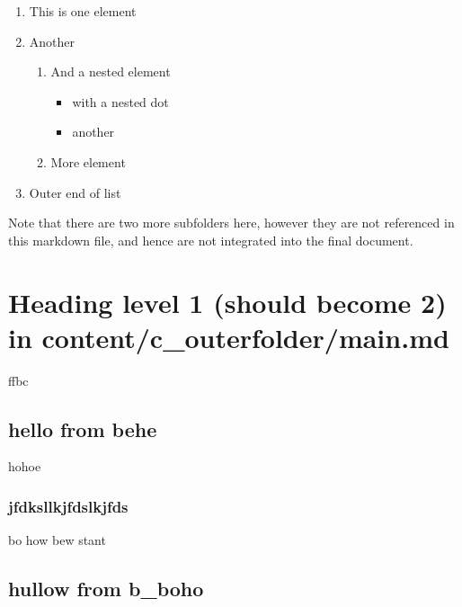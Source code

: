 \documentclass{paper}
\def\tightlist{} %
\begin{document}
\begin{enumerate}
\def\labelenumi{\arabic{enumi}.}
\tightlist
\item
  This is one element
\item
  Another

  \begin{enumerate}
  \def\labelenumii{\arabic{enumii}.}
  \tightlist
  \item
    And a nested element

    \begin{itemize}
    \tightlist
    \item
      with a nested dot
    \item
      another
    \end{itemize}
  \item
    More element
  \end{enumerate}
\item
  Outer end of list
\end{enumerate}

Note that there are two more subfolders here, however they are not
referenced in this markdown file, and hence are not integrated into the
final document.

\hypertarget{heading-level-1-should-become-2-in-contentc_outerfoldermain.md}{%
\section{Heading level 1 (should become 2) in
content/c\_outerfolder/main.md}\label{heading-level-1-should-become-2-in-contentc_outerfoldermain.md}}

ffbc

\hypertarget{hello-from-behe}{%
\subsection{hello from behe}\label{hello-from-behe}}

hohoe

\hypertarget{jfdksllkjfdslkjfds}{%
\subsubsection{jfdksllkjfdslkjfds}\label{jfdksllkjfdslkjfds}}

bo how bew stant

\hypertarget{hullow-from-b_boho}{%
\subsection{hullow from b\_boho}\label{hullow-from-b_boho}}
\end{document}
